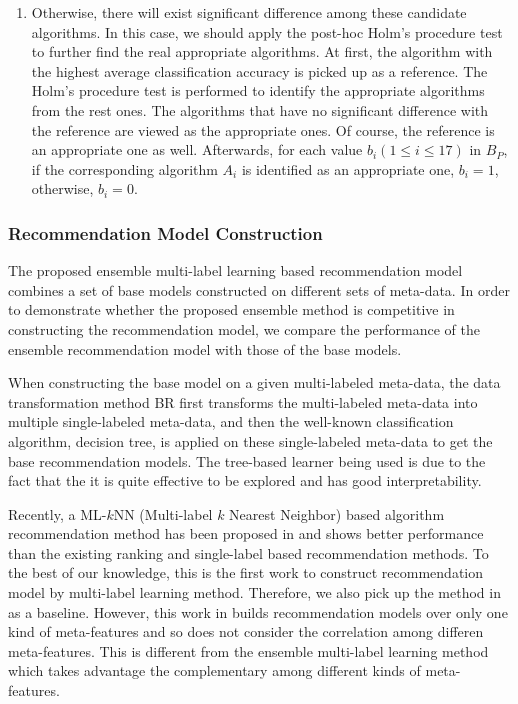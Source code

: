\documentclass[prodmode,acmtkdd]{acmsmall}
\begin{document}
\begin{enumerate}
\begin{enumerate}
\begin{enumerate}
            \item Otherwise, there will exist significant
            difference among these candidate algorithms. In this case, we should apply
            the post-hoc Holm's procedure test to further find the real
            appropriate algorithms. At first, the algorithm with the
            highest average classification accuracy is picked up as a reference.
            The Holm's procedure test is performed to identify the appropriate
            algorithms from the rest ones. The algorithms that have no significant
            difference with the reference are viewed as the appropriate
            ones. Of course, the reference is an appropriate one as
            well. Afterwards, for each value $b_i (1\leq i\leq 17)$ in $B_{P}$, if the corresponding
            algorithm $A_i$ is identified as an appropriate one, $b_i = 1$,
            otherwise, $b_i = 0$.
        \end{enumerate}
    \end{enumerate}
\end{enumerate}

\subsubsection{Recommendation Model Construction}

The proposed ensemble multi-label learning based recommendation
model combines a set of base models constructed on different sets of
meta-data. In order to demonstrate whether the proposed ensemble
method is competitive in constructing the recommendation model, we
compare the performance of the ensemble recommendation model with
those of the base models.

When constructing the base model on a given multi-labeled meta-data,
the data transformation method BR first transforms the multi-labeled
meta-data into multiple single-labeled meta-data, and then the
well-known classification algorithm, decision tree, is applied on
these single-labeled meta-data to get the base recommendation
models. The tree-based learner being used is due to the fact that
the it is quite effective to be explored and has good
interpretability.

Recently, a ML-$k$NN (Multi-label $k$ Nearest Neighbor) based algorithm recommendation
method has been proposed in \cite{wang2014generic} and shows better
performance than the existing ranking and single-label based
recommendation methods. To the best of our knowledge, this is the first work to construct
recommendation model by multi-label learning method. Therefore, we also pick up the method in \cite{wang2014generic} as a baseline. However, this work in \cite{wang2014generic} builds recommendation models over only one kind of meta-features and so does not consider the correlation among differen meta-features. This is different from the ensemble multi-label learning method which takes advantage the complementary among different kinds of meta-features.
\end{document}
